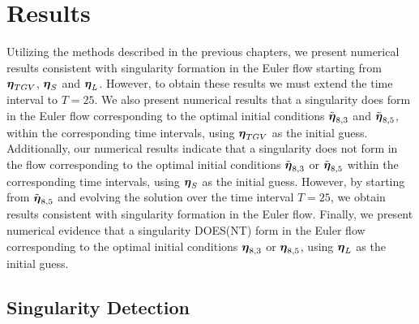 \chapter{Results}\label{chapter:5}

{\color{red}Utilizing the methods described in the previous chapters, we present numerical results consistent with singularity formation in the Euler flow starting from ${\boldsymbol \eta}_{TGV}$, ${\boldsymbol \eta}_S$ and ${\boldsymbol \eta}_L$. However, to obtain these results we must extend the time interval to $T=25$. We also present numerical results that a singularity does form in the Euler flow corresponding to the optimal initial conditions $\tilde{{\boldsymbol \eta}}_{8,3}$ and $\tilde{{\boldsymbol \eta}}_{8,5}$, within the corresponding time intervals, using ${\boldsymbol \eta}_{TGV}$ as the initial guess. Additionally, our numerical results indicate that a singularity does not form in the flow corresponding to the optimal initial conditions $\tilde{{\boldsymbol \eta}}_{8,3}$ or $\tilde{{\boldsymbol \eta}}_{8,5}$ within the corresponding time intervals, using ${\boldsymbol \eta}_S$ as the initial guess. However, by starting from $\tilde{{\boldsymbol \eta}}_{8,5}$ and evolving the solution over the time interval $T=25$, we obtain results consistent with singularity formation in the Euler flow. Finally, we present numerical evidence that a singularity DOES(NT) form in the Euler flow corresponding to the optimal initial conditions ${\boldsymbol \eta}_{8,3}$ or ${\boldsymbol \eta}_{8,5}$, using ${\boldsymbol \eta}_L$ as the initial guess.}

\section{Singularity Detection}

